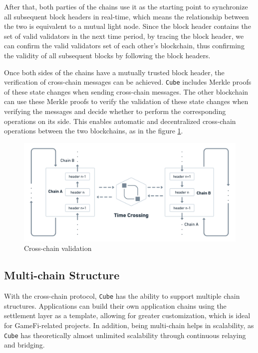 \documentclass{iacrtrans}
\begin{document}
After that, both parties of the chains use it as the starting point to synchronize all subsequent block headers in real-time, which means the relationship between the two is equivalent to a mutual light node. Since the block header contains the set of valid validators in the next time period, by tracing the block header, we can confirm the valid validators set of each other's blockchain, thus confirming the validity of all subsequent blocks by following the block headers.

Once both sides of the chains have a mutually trusted block header, the verification of cross-chain messages can be achieved. \texttt{Cube} includes Merkle proofs of these state changes when sending cross-chain messages. The other blockchain can use these Merkle proofs to verify the validation of these state changes when verifying the messages and decide whether to perform the corresponding operations on its side. This enables automatic and decentralized cross-chain operations between the two blockchains, as in the figure \ref{fig:9}.

\begin{figure}[!htbp]
	\centering
	\includegraphics[width=\textwidth]{images/9.png}
	\caption{Cross-chain validation}
	\label{fig:9} 
\end{figure}

\subsection{Multi-chain Structure}
With the cross-chain protocol, \texttt{Cube} has the ability to support multiple chain structures. Applications can build their own application chains using the settlement layer as a template, allowing for greater customization, which is ideal for GameFi-related projects. In addition, being multi-chain helps in scalability, as \texttt{Cube} has theoretically almost unlimited scalability through continuous relaying and bridging.
\end{document}
